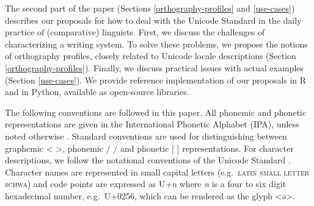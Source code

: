 The second part of the paper (Sections \ref{orthography-profiles} and
\ref{use-cases}) describes our proposals for how to deal with the Unicode
Standard in the daily practice of (comparative) linguists. First, we discuss the
challenges of characterizing a writing system. To solve these problems, we
propose the notions of orthography profiles, closely related to Unicode locale
descriptions (Section \ref{orthography-profiles}). Finally, we discuss practical
issues with actual examples (Section \ref{use-cases}). We provide reference
implementation of our proposals in R and in Python, available as open-source
libraries.

The following conventions are followed in this paper. All phonemic and phonetic
representations are given in the International Phonetic Alphabet (IPA), unless
noted otherwise \citep{IPA2005}. Standard conventions are used for
distinguishing between graphemic < >, phonemic / / and phonetic [ ]
representations. For character descriptions, we follow the notational
conventions of the Unicode Standard \citep{Unicode2014}. Character names are
represented in small capital letters (e.g.~\textsc{latin small letter schwa})
and code points are expressed as U\emph{+n} where \emph{n} is a four to six
digit hexadecimal number, e.g.~U+0256, which can be rendered as the glyph <ə>.

